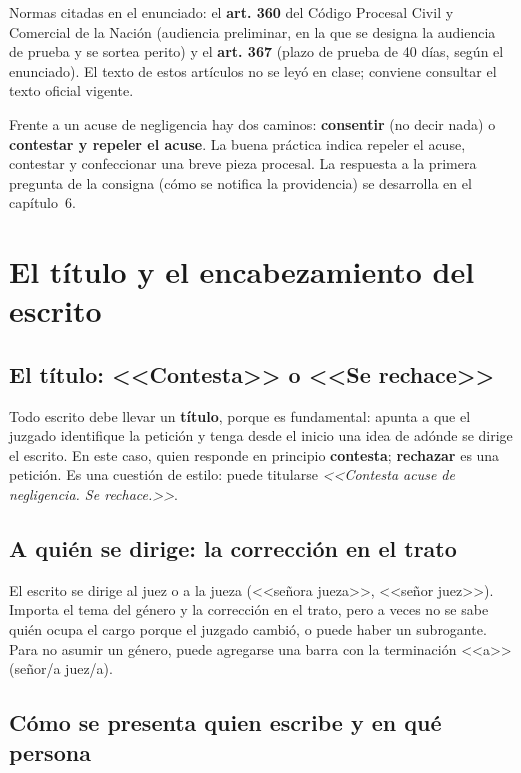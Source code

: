 \documentclass[12pt,oneside]{book}
\begin{document}

\begin{note}
Normas citadas en el enunciado: el \textbf{art. 360} del Código Procesal Civil y Comercial de la Nación (audiencia preliminar, en la que se designa la audiencia de prueba y se sortea perito) y el \textbf{art. 367} (plazo de prueba de 40 días, según el enunciado). El texto de estos artículos no se leyó en clase; conviene consultar el texto oficial vigente.
\end{note}

Frente a un acuse de negligencia hay dos caminos: \textbf{consentir} (no decir nada) o \textbf{contestar y repeler el acuse}. La buena práctica indica repeler el acuse, contestar y confeccionar una breve pieza procesal. La respuesta a la primera pregunta de la consigna (cómo se notifica la providencia) se desarrolla en el capítulo~6.

\section{El título y el encabezamiento del escrito}

\subsection{El título: <<Contesta>> o <<Se rechace>>}

Todo escrito debe llevar un \textbf{título}, porque es fundamental: apunta a que el juzgado identifique la petición y tenga desde el inicio una idea de adónde se dirige el escrito. En este caso, quien responde en principio \textbf{contesta}; \textbf{rechazar} es una petición. Es una cuestión de estilo: puede titularse \textit{<<Contesta acuse de negligencia. Se rechace.>>}.

\subsection{A quién se dirige: la corrección en el trato}

El escrito se dirige al juez o a la jueza (<<señora jueza>>, <<señor juez>>). Importa el tema del género y la corrección en el trato, pero a veces no se sabe quién ocupa el cargo porque el juzgado cambió, o puede haber un subrogante. Para no asumir un género, puede agregarse una barra con la terminación <<a>> (señor/a juez/a).

\subsection{Cómo se presenta quien escribe y en qué persona}
\end{document}
